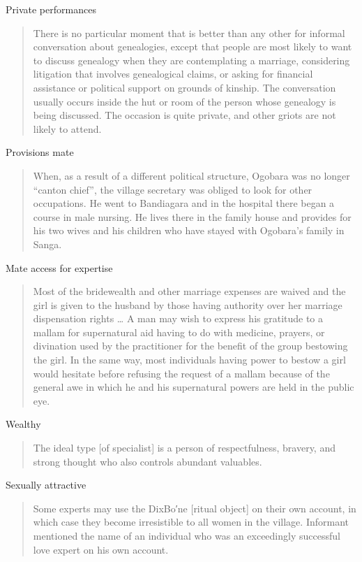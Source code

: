 \documentclass[
]{article}
\begin{document}
Private performances

\begin{quote}
There is no particular moment that is better than any other for informal conversation about genealogies, except that people are most likely to want to discuss genealogy when they are contemplating a marriage, considering litigation that involves genealogical claims, or asking for financial assistance or political support on grounds of kinship. The conversation usually occurs inside the hut or room of the person whose genealogy is being discussed. The occasion is quite private, and other griots are not likely to attend.
\end{quote}

Provisions mate

\begin{quote}
When, as a result of a different political structure, Ogobara was no longer ``canton chief'', the village secretary was obliged to look for other occupations. He went to Bandiagara and in the hospital there began a course in male nursing. He lives there in the family house and provides for his two wives and his children who have stayed with Ogobara's family in Sanga.
\end{quote}

Mate access for expertise

\begin{quote}
Most of the bridewealth and other marriage expenses are waived and the girl is given to the husband by those having authority over her marriage dispensation rights \ldots{} A man may wish to express his gratitude to a mallam for supernatural aid having to do with medicine, prayers, or divination used by the practitioner for the benefit of the group bestowing the girl. In the same way, most individuals having power to bestow a girl would hesitate before refusing the request of a mallam because of the general awe in which he and his supernatural powers are held in the public eye.
\end{quote}

Wealthy

\begin{quote}
The ideal type {[}of specialist{]} is a person of respectfulness, bravery, and strong thought who also controls abundant valuables.
\end{quote}

Sexually attractive

\begin{quote}
Some experts may use the DixBo′ne {[}ritual object{]} on their own account, in which case they become irresistible to all women in the village. Informant mentioned the name of an individual who was an exceedingly successful love expert on his own account.
\end{quote}
\end{document}
